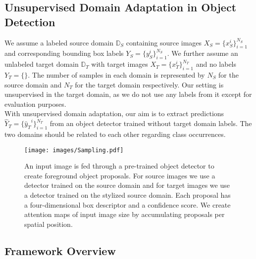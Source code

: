 \documentclass[10pt,twocolumn,letterpaper]{article}
\begin{document}
\subsection{Unsupervised Domain Adaptation in Object Detection}
We assume a labeled source domain $\mathbb{D}_S$ containing source images $X_S = \{x_S^i\}_{i = 1}^{N_S}$ and corresponding bounding box labels $Y_S = \{y_S^i\}_{i = 1}^{N_S}$. We further assume an unlabeled target domain $\mathbb{D}_T$ with target images $X_T = \{x_T^i\}_{i = 1}^{N_T}$ and no labels $Y_T = \{\}$. The number of samples in each domain is represented by $N_S$ for the source domain and $N_T$ for the target domain respectively. Our setting is unsupervised in the target domain, as we do not use any labels from it except for evaluation purposes. \\
With unsupervised domain adaptation, our aim is to extract predictions $\hat{Y}_T = \{{\hat{y}_{T}}^i\}_{i = 1}^{N_T}$ from an object detector trained without target domain labels. The two domains should be related to each other regarding class occurrences.

\begin{figure*}[t]
	\centering
	\texttt{[image: images/Sampling.pdf]}
	\caption{An input image is fed through a pre-trained object detector to create foreground object proposals. For source images we use a detector trained on the source domain and for target images we use a detector trained on the stylized source domain. Each proposal has a four-dimensional box descriptor and a confidence score. We create attention maps of input image size by accumulating proposals per spatial position.}
	\label{fig:Sampling}
\end{figure*}

\subsection{Framework Overview}
\end{document}

